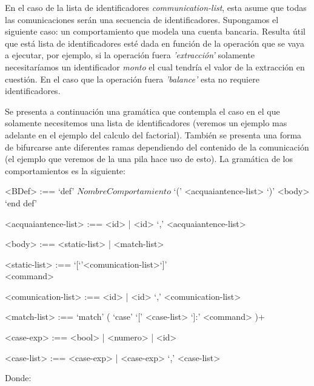 En el caso de la lista de identificadores \textit{communication-list}, esta asume que todas las comunicaciones serán una secuencia de identificadores. Supongamos el siguiente caso: un comportamiento que modela una cuenta bancaria. Resulta útil que está lista de identificadores esté dada en función de la operación que se vaya a ejecutar, por ejemplo, si la operación fuera \textit{'extracción'} solamente necesitaríamos un identificador \textit{monto} el cual tendría el valor de la extracción en cuestión. En el caso que la operación fuera \textit{'balance'} esta no requiere identificadores. 

Se presenta a continuación una gramática que contempla el caso en el que solamente necesitemos una lista de identificadores (veremos un ejemplo mas adelante en el ejemplo del calculo del factorial). También se presenta una forma de bifurcarse ante diferentes ramas dependiendo del contenido de la comunicación (el ejemplo que veremos de la una pila hace uso de esto). La gramática de los comportamientos es la siguiente:

\begin{grammar}
<BDef> :== `def' $NombreComportamiento$ `(' <acquaiantence-list> `)' <body> `end def'

<acquaiantence-list> :== <id> | <id> `,' <acquaiantence-list> 

<body> :== <static-list> | <match-list>

<static-list> :== `[`'<comunication-list>`]' \\ <command>

<comunication-list> :== <id> | <id> `,' <comunication-list>

<match-list> :==  `match' ( `case' `[' <case-list> `]:' <command> )+  

<case-exp> :== <bool> | <numero> | <id>  

<case-list> :== <case-exp> | <case-exp> `,' <case-list> 


\end{grammar}

Donde: 

